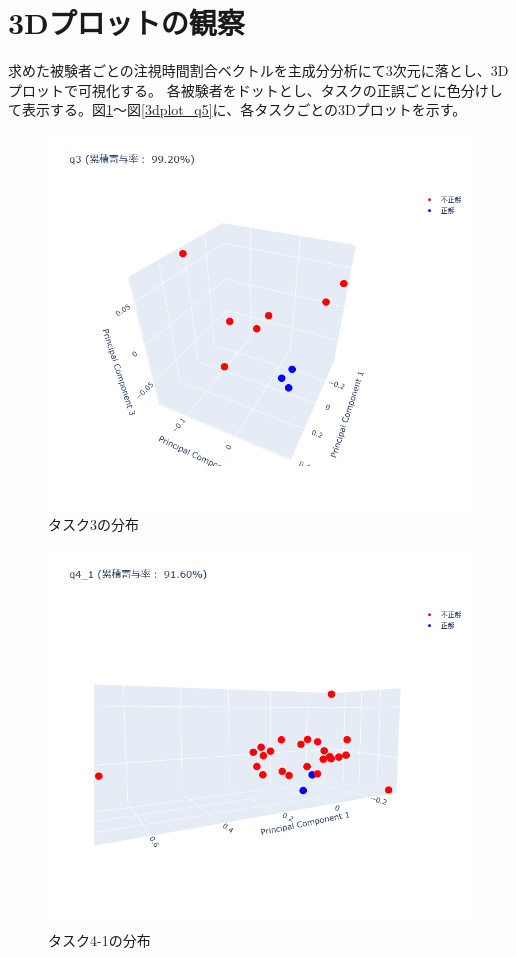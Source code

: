 \documentclass[paper=a4paper,fontsize=11pt]{jlreq}
\begin{document}
  \section{3Dプロットの観察}
    求めた被験者ごとの注視時間割合ベクトルを主成分分析にて3次元に落とし、3Dプロットで可視化する。
    各被験者をドットとし、タスクの正誤ごとに色分けして表示する。図\ref{3dplot_q3}～図\ref{3dplot_q5}に、各タスクごとの3Dプロットを示す。
    \begin{figure}[htbp]
      \centering
      \includegraphics[width=0.8\linewidth]{3dplot_q3.png}
      \caption{タスク3の分布}
      \label{3dplot_q3}
    \end{figure}
    \FloatBarrier
    \begin{figure}[htbp]
      \centering
      \includegraphics[width=0.8\linewidth]{3dplot_q4_1.png}
      \caption{タスク4-1の分布}
      \label{3dplot_q4_1}
    \end{figure}
\end{document}
